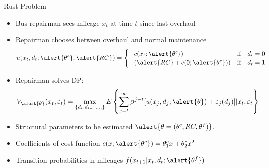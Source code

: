\documentclass[aspectratio=169,11pt]{beamer}
\begin{document}
\begin{frame}{Rust Problem}
\footnotesize
\begin{itemize}
\item Bus repairman sees mileage $x_t$ at time $t$ since last overhaul
\item Repairman chooses between overhaul and normal maintenance
\begin{align*}
u(x_t, d_t; \alert{\theta^c}, \alert{RC}) =
\begin{cases} -c(x_t;\alert{\theta^c}) \quad &\mbox{if} \quad d_t=0\\
-(\alert{RC} + c(0;\alert{\theta^c})) &\mbox{if} \quad d_t =1\\
\end{cases}
\end{align*}
\item Repairman solves DP:
\begin{align*}
V_{\alert{\theta}} (x_t, \varepsilon_t) = \max_{\{d_t,d_{t+1},\ldots\}} E \left\{  \sum_{j=t}^{\infty} \beta^{j-t}   [u(x_j,d_j;\alert{\theta}) + \varepsilon_{j}(d_j)]| x_t, \varepsilon_t \right\}
\end{align*}
\end{itemize}
\begin{itemize}
\item Structural parameters to be estimated $\alert{\theta = (\theta^c, RC, \theta^f)}$.
\item Coefficients of cost function $c(x;\alert{\theta^c}) = \theta^c_1 x + \theta^c_2 x^2$
\item Transition probabilities in mileages $f(x_{t+1} | x_t, d_t; \alert{\theta^f})$
\end{itemize}
\end{frame}
\end{document}
